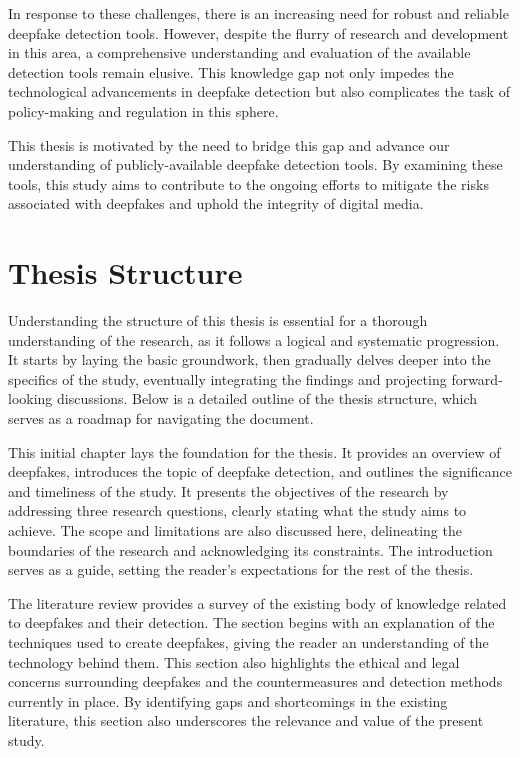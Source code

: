 In response to these challenges, there is an increasing need for robust and reliable
deepfake detection tools. However, despite the flurry of research and development in this
area, a comprehensive understanding and evaluation of the available detection tools remain
elusive. This knowledge gap not only impedes the technological advancements in deepfake
detection but also complicates the task of policy-making and regulation in this sphere.

This thesis is motivated by the need to bridge this gap and advance our understanding of
publicly-available deepfake detection tools. By examining these tools, this study aims to
contribute to the ongoing efforts to mitigate the risks associated with deepfakes and uphold
the integrity of digital media.


\section{Thesis Structure}\label{chapter:structure}
Understanding the structure of this thesis is essential for a thorough understanding of the
research, as it follows a logical and systematic progression. It starts by laying the basic
groundwork, then gradually delves deeper into the specifics of the study, eventually
integrating the findings and projecting forward-looking discussions. Below is a
detailed outline of the thesis structure, which serves as a roadmap for navigating
the document.

This initial chapter lays the foundation for the thesis. It provides an overview of deepfakes,
introduces the topic of deepfake detection, and outlines the significance and timeliness
of the study. It presents the objectives of the research by addressing three research
questions, clearly stating what the study aims to achieve. The scope and limitations are
also discussed here, delineating the boundaries of the research and acknowledging
its constraints. The introduction serves as a guide, setting the reader's expectations
for the rest of the thesis.

The literature review provides a survey of the existing body of knowledge
related to deepfakes and their detection. The section begins with an explanation of the
techniques used to create deepfakes, giving the reader an understanding of the
technology behind them. This section also highlights the ethical and legal concerns
surrounding deepfakes and the countermeasures and detection methods currently in place.
By identifying gaps and shortcomings in the existing literature, this section also
underscores the relevance and value of the present study.

